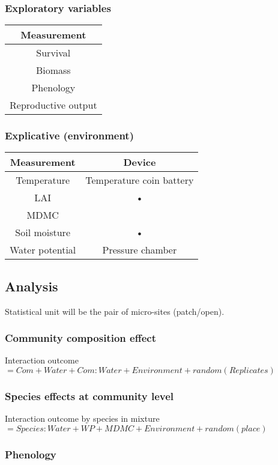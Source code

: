 \documentclass[12pt]{article} %
\begin{document}
\subsubsection{Exploratory variables}
\begin{tabular}{c}
Measurement \\ 
\hline
Survival \\ 
Biomass \\ 
Phenology \\ 
Reproductive output \\
\hline 
\end{tabular}

\subsubsection{Explicative (environment)}
\begin{tabular}{cc}
Measurement & Device \\ 
\hline
Temperature & Temperature coin battery \\ 
LAI & • \\ 
MDMC &  \\ 
Soil moisture & • \\ 
Water potential & Pressure chamber \\ 
\hline 
\end{tabular} 

\subsection{Analysis}

Statistical unit will be the pair of micro-sites (patch/open).


\subsubsection{Community composition effect}

Interaction outcome $= Com + Water + Com:Water + Environment + random(Replicates) $
\subsubsection{Species effects at community level}
Interaction outcome by species in mixture$ = Species:Water + WP + MDMC + Environment + random(place)$

\subsubsection{Phenology}





\end{document}
